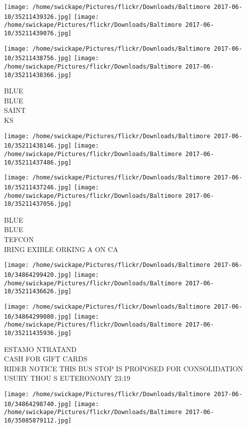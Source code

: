 \documentclass[10pt,letterpaper]{article}
\begin{document}
\texttt{[image: /home/swickape/Pictures/flickr/Downloads/Baltimore 2017-06-10/35211439326.jpg]}
\texttt{[image: /home/swickape/Pictures/flickr/Downloads/Baltimore 2017-06-10/35211439076.jpg]}

\texttt{[image: /home/swickape/Pictures/flickr/Downloads/Baltimore 2017-06-10/35211438756.jpg]}
\texttt{[image: /home/swickape/Pictures/flickr/Downloads/Baltimore 2017-06-10/35211438366.jpg]}

BLUE\\
BLUE\\
SAINT\\
KS\\
\pagebreak

\texttt{[image: /home/swickape/Pictures/flickr/Downloads/Baltimore 2017-06-10/35211438146.jpg]}
\texttt{[image: /home/swickape/Pictures/flickr/Downloads/Baltimore 2017-06-10/35211437486.jpg]}

\texttt{[image: /home/swickape/Pictures/flickr/Downloads/Baltimore 2017-06-10/35211437246.jpg]}
\texttt{[image: /home/swickape/Pictures/flickr/Downloads/Baltimore 2017-06-10/35211437056.jpg]}

BLUE\\
BLUE\\
TEFCON\\
IRING EXIBLE ORKING A ON CA\\
\pagebreak

\texttt{[image: /home/swickape/Pictures/flickr/Downloads/Baltimore 2017-06-10/34864299420.jpg]}
\texttt{[image: /home/swickape/Pictures/flickr/Downloads/Baltimore 2017-06-10/35211436626.jpg]}

\texttt{[image: /home/swickape/Pictures/flickr/Downloads/Baltimore 2017-06-10/34864299080.jpg]}
\texttt{[image: /home/swickape/Pictures/flickr/Downloads/Baltimore 2017-06-10/35211435936.jpg]}

ESTAMO NTRATAND\\
CASH FOR GIFT CARDS\\
RIDER NOTICE THIS BUS STOP IS PROPOSED FOR CONSOLIDATION\\
USURY THOU S EUTERONOMY 23:19\\
\pagebreak

\texttt{[image: /home/swickape/Pictures/flickr/Downloads/Baltimore 2017-06-10/34864298740.jpg]}
\texttt{[image: /home/swickape/Pictures/flickr/Downloads/Baltimore 2017-06-10/35085879112.jpg]}
\end{document}
